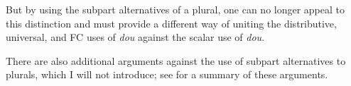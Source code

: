 \documentclass[12pt]{article}
\begin{document}
But by using the subpart alternatives of a plural, one can no longer appeal to this distinction and must provide a different way of uniting the distributive, universal, and FC uses of \emph{dou} against the scalar use of \emph{dou}.

There are also additional arguments against the use of subpart alternatives to plurals, which I will not introduce; see \citealt[pp. 1063]{bar-levImplicatureAccountHomogeneity2021} for a summary of these arguments.

%
%
%
\end{document}
